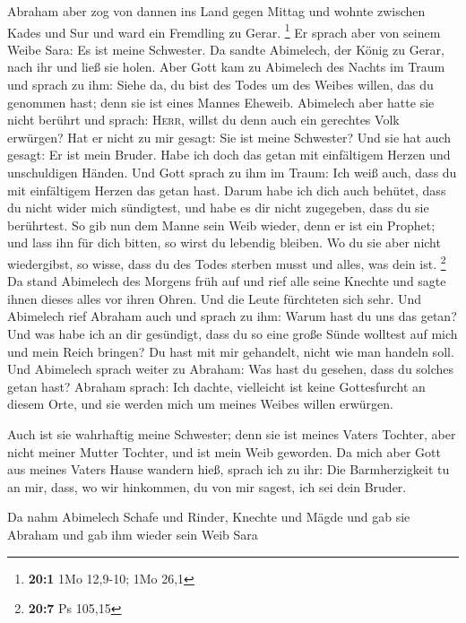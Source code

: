  Abraham aber zog von dannen ins Land gegen Mittag und
wohnte zwischen Kades und Sur und ward ein Fremdling zu Gerar.
\footnote{\textbf{20:1} 1Mo 12,9-10; 1Mo 26,1}  Er sprach
aber von seinem Weibe Sara: Es ist meine Schwester. Da sandte Abimelech,
der König zu Gerar, nach ihr und ließ sie holen.  Aber
Gott kam zu Abimelech des Nachts im Traum und sprach zu ihm: Siehe da,
du bist des Todes um des Weibes willen, das du genommen hast; denn sie
ist eines Mannes Eheweib.  Abimelech aber hatte sie nicht
berührt und sprach: \textsc{Herr}, willst du denn auch ein gerechtes
Volk erwürgen?  Hat er nicht zu mir gesagt: Sie ist meine
Schwester? Und sie hat auch gesagt: Er ist mein Bruder. Habe ich doch
das getan mit einfältigem Herzen und unschuldigen Händen. 
Und Gott sprach zu ihm im Traum: Ich weiß auch, dass du mit einfältigem
Herzen das getan hast. Darum habe ich dich auch behütet, dass du nicht
wider mich sündigtest, und habe es dir nicht zugegeben, dass du sie
berührtest.  So gib nun dem Manne sein Weib wieder, denn
er ist ein Prophet; und lass ihn für dich bitten, so wirst du lebendig
bleiben. Wo du sie aber nicht wiedergibst, so wisse, dass du des Todes
sterben musst und alles, was dein ist. \footnote{\textbf{20:7} Ps 105,15}
 Da stand Abimelech des Morgens früh auf und rief alle
seine Knechte und sagte ihnen dieses alles vor ihren Ohren. Und die
Leute fürchteten sich sehr.  Und Abimelech rief Abraham
auch und sprach zu ihm: Warum hast du uns das getan? Und was habe ich an
dir gesündigt, dass du so eine große Sünde wolltest auf mich und mein
Reich bringen? Du hast mit mir gehandelt, nicht wie man handeln soll.
 Und Abimelech sprach weiter zu Abraham: Was hast du
gesehen, dass du solches getan hast?  Abraham sprach: Ich
dachte, vielleicht ist keine Gottesfurcht an diesem Orte, und sie werden
mich um meines Weibes willen erwürgen.

 Auch ist sie wahrhaftig meine Schwester; denn sie ist
meines Vaters Tochter, aber nicht meiner Mutter Tochter, und ist mein
Weib geworden.  Da mich aber Gott aus meines Vaters Hause
wandern hieß, sprach ich zu ihr: Die Barmherzigkeit tu an mir, dass, wo
wir hinkommen, du von mir sagest, ich sei dein Bruder.

 Da nahm Abimelech Schafe und Rinder, Knechte und Mägde
und gab sie Abraham und gab ihm wieder sein Weib Sara

